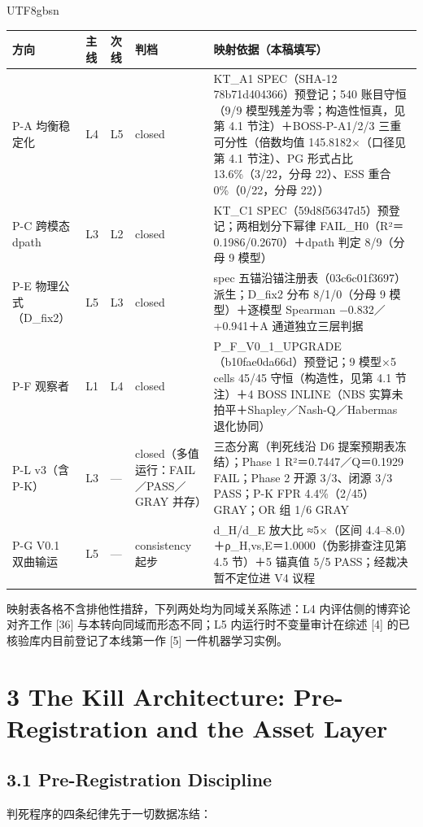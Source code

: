 \documentclass[10pt,a4paper]{article}
\begin{document}
\begin{CJK}{UTF8}{gbsn}
\begin{longtable}{>{\raggedright\arraybackslash}p{68pt}>{\raggedright\arraybackslash}p{20pt}>{\raggedright\arraybackslash}p{20pt}>{\raggedright\arraybackslash}p{70pt}>{\raggedright\arraybackslash}p{202pt}}
\toprule
\textbf{方向} & \textbf{主线} & \textbf{次线} & \textbf{判档} & \textbf{映射依据（本稿填写）} \\
\midrule
\endhead
P-A 均衡稳定化 & L4 & L5 & closed & KT\_A1 SPEC（SHA-12 78b71d404366）预登记；540 账目守恒（9/9 模型残差为零；构造性恒真，见第 4.1 节注）＋BOSS-P-A1/2/3 三重可分性（倍数均值 145.8182×（口径见第 4.1 节注）、PG 形式占比 13.6\%（3/22，分母 22）、ESS 重合 0\%（0/22，分母 22）） \\
P-C 跨模态 dpath & L3 & L2 & closed & KT\_C1 SPEC（59d8f56347d5）预登记；两相划分下幂律 FAIL\_H0（R²＝0.1986/0.2670）＋dpath 判定 8/9（分母 9 模型） \\
P-E 物理公式（D\_fix2） & L5 & L3 & closed & spec 五锚沿锚注册表（03c6c01f3697）派生；D\_fix2 分布 8/1/0（分母 9 模型）＋逐模型 Spearman −0.832／+0.941＋A 通道独立三层判据 \\
P-F 观察者 & L1 & L4 & closed & P\_F\_V0\_1\_UPGRADE（b10fae0da66d）预登记；9 模型×5 cells 45/45 守恒（构造性，见第 4.1 节注）＋4 BOSS INLINE（NBS 实算未拍平＋Shapley／Nash-Q／Habermas 退化协同） \\
P-L v3（含 P-K） & L3 & — & closed（多值运行：FAIL／PASS／GRAY 并存） & 三态分离（判死线沿 D6 提案预期表冻结）；Phase 1 R²＝0.7447／Q＝0.1929 FAIL；Phase 2 开源 3/3、闭源 3/3 PASS；P-K FPR 4.4\%（2/45）GRAY；OR 组 1/6 GRAY \\
P-G V0.1 双曲输运 & L5 & — & consistency 起步 & d\_H/d\_E 放大比 ≈5×（区间 4.4–8.0）＋ρ\_H,vs,E＝1.0000（伪影排查注见第 4.5 节）＋5 锚真值 5/5 PASS；经裁决暂不定位进 V4 议程 \\
\bottomrule
\end{longtable}

映射表各格不含排他性措辞，下列两处均为同域关系陈述：L4 内评估侧的博弈论对齐工作 [36] 与本转向同域而形态不同；L5 内运行时不变量审计在综述 [4] 的已核验库内目前登记了本线第一作 [5] 一件机器学习实例。


\section*{3 The Kill Architecture: Pre-Registration and the Asset Layer}\subsection*{3.1 Pre-Registration Discipline}判死程序的四条纪律先于一切数据冻结：


\end{CJK}
\end{document}

